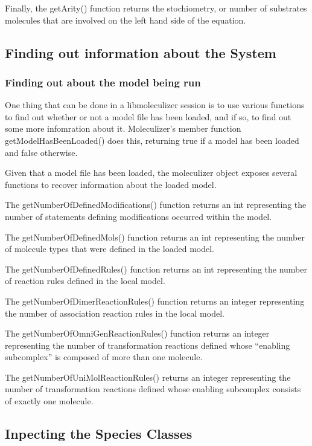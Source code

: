 Finally, the getArity() function returns the stochiometry, or number
of substrates molecules that are involved on the left hand side of the
equation.

\subsection{ Finding out information about the System}

\subsubsection{Finding out about the model being run}

One thing that can be done in a libmoleculizer session is to use
various functions to find out whether or not a model file has been
loaded, and if so, to find out some more infomration about it.
Moleculizer's member function getModelHasBeenLoaded() does this,
returning true if a model has been loaded and false otherwise.  

Given that a model file has been loaded, the moleculizer object
exposes several functions to recover information about the loaded
model.  

The getNumberOfDefinedModifications() function returns an int
representing the number of statements defining modifications occurred
within the model.  

The getNumberOfDefinedMols() function returns an int representing the
number of molecule types that were defined in the loaded model.  

The getNumberOfDefinedRules() function returns an int representing the
number of reaction rules defined in the local model.

The getNumberOfDimerReactionRules() function returns an integer
representing the number of association reaction rules in the local model.

The getNumberOfOmniGenReactionRules() function returns an integer
representing the number of transformation reactions defined whose ``enabling
subcomplex'' is composed of more than one molecule.

The getNumberOfUniMolReactionRules() returns an integer representing
the number of transformation reactions defined whose enabling
subcomplex consists of exactly one molecule.  

\subsection{Inpecting the Species Classes}


